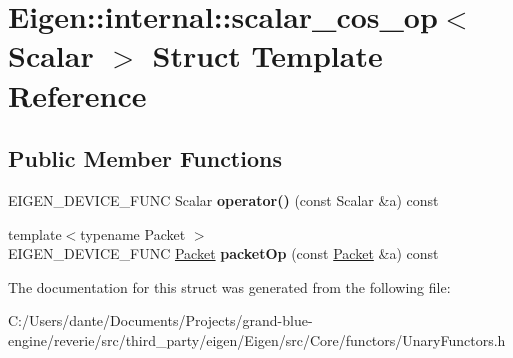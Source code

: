 \hypertarget{struct_eigen_1_1internal_1_1scalar__cos__op}{}\section{Eigen\+::internal\+::scalar\+\_\+cos\+\_\+op$<$ Scalar $>$ Struct Template Reference}
\label{struct_eigen_1_1internal_1_1scalar__cos__op}
\subsection*{Public Member Functions}
\begin{DoxyCompactItemize}
\item 
\mbox{\label{struct_eigen_1_1internal_1_1scalar__cos__op_ad1350db45d4f034c6b76d4e7e115ef6e}} 
E\+I\+G\+E\+N\+\_\+\+D\+E\+V\+I\+C\+E\+\_\+\+F\+U\+NC Scalar {\bfseries operator()} (const Scalar \&a) const
\item 
\mbox{\label{struct_eigen_1_1internal_1_1scalar__cos__op_ad4038c3e133d18c0132a8368837ca6ef}} 
{\footnotesize template$<$typename Packet $>$ }\\E\+I\+G\+E\+N\+\_\+\+D\+E\+V\+I\+C\+E\+\_\+\+F\+U\+NC \mbox{\hyperlink{union_eigen_1_1internal_1_1_packet}{Packet}} {\bfseries packet\+Op} (const \mbox{\hyperlink{union_eigen_1_1internal_1_1_packet}{Packet}} \&a) const
\end{DoxyCompactItemize}


The documentation for this struct was generated from the following file\+:\begin{DoxyCompactItemize}
\item 
C\+:/\+Users/dante/\+Documents/\+Projects/grand-\/blue-\/engine/reverie/src/third\+\_\+party/eigen/\+Eigen/src/\+Core/functors/Unary\+Functors.\+h\end{DoxyCompactItemize}
